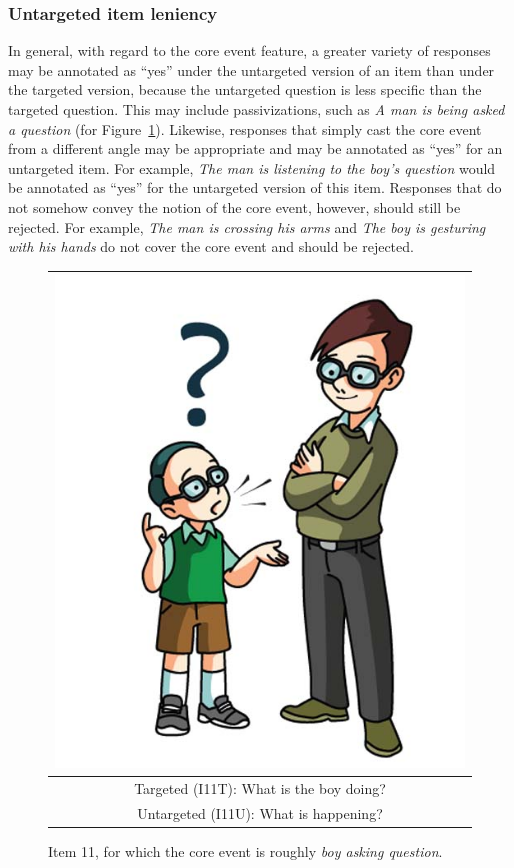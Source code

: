 \documentclass[12pt,notitlepage]{article}
\begin{document}
\subsubsection{Untargeted item leniency} In general, with regard to the core event feature, a greater variety of responses may be annotated as ``yes'' under the untargeted version of an item than under the targeted version, because the untargeted question is less specific than the targeted question. This may include passivizations, such as \textit{A man is being asked a question} (for Figure~\ref{fig:ask-question}). Likewise, responses that simply cast the core event from a different angle may be appropriate and may be annotated as ``yes'' for an untargeted item. For example, \textit{The man is listening to the boy's question} would be annotated as ``yes'' for the untargeted version of this item. Responses that do not somehow convey the notion of the core event, however, should still be rejected. For example, \textit{The man is crossing his arms} and \textit{The boy is gesturing with his hands} do not cover the core event and should be rejected.
\begin{figure}[h]
\begin{center}
\begin{tabular}{|c|}
\hline
\includegraphics[width=0.4\columnwidth,trim=0 0 0 -3]{figures/I11.jpg}\\
\hline
Targeted (I11T): What is the boy doing?\\
\hline
Untargeted (I11U): What is happening? \\
\hline
\end{tabular}
\end{center}
\caption{Item 11, for which the core event is roughly \textit{boy asking question}.}
\label{fig:ask-question}
\end{figure}
\end{document}
